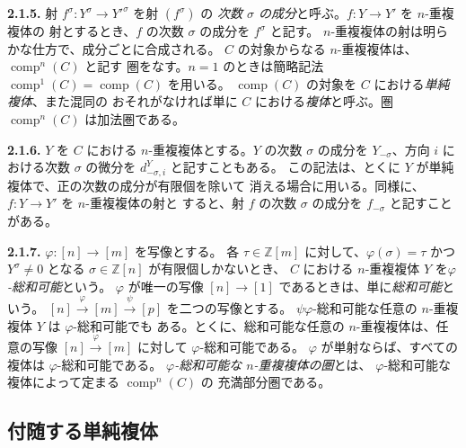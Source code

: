 \clearpage
{}%
\noindent\textbf{2.1.5.}\quad
射 $f^\sigma\colon Y^\sigma\to Y'^\sigma$ を射 $(f^\sigma)$ の
\emph{次数 $\sigma$ の成分}と呼ぶ。$f\colon Y\to Y'$ を $n$-重複複体の
射とするとき、$f$ の次数 $\sigma$ の成分を $f^\sigma$ と記す。
$n$-重複複体の射は明らかな仕方で、成分ごとに合成される。
$C$ の対象からなる $n$-重複複体は、$\operatorname{comp}^{n}(C)$ と記す
圏をなす。$n=1$ のときは簡略記法
$\operatorname{comp}^{1}(C)=\operatorname{comp}(C)$ を用いる。
$\operatorname{comp}(C)$ の対象を $C$ における\emph{単純複体}、また混同の
おそれがなければ単に $C$ における\emph{複体}と呼ぶ。圏
$\operatorname{comp}^{n}(C)$ は加法圏である。

\noindent\textbf{2.1.6.}\quad
$Y$ を $C$ における $n$-重複複体とする。$Y$ の次数 $\sigma$ の成分を
$Y_{-\sigma}$、方向 $i$ における次数 $\sigma$ の微分を
$d^Y_{-\sigma,i}$ と記すこともある。
この記法は、とくに $Y$ が単純複体で、正の次数の成分が有限個を除いて
消える場合に用いる。同様に、$f\colon Y\to Y'$ を $n$-重複複体の射と
すると、射 $f$ の次数 $\sigma$ の成分を $f_{-\sigma}$ と記すことがある。

\noindent\textbf{2.1.7.}\quad
$\varphi\colon[n]\to[m]$ を写像とする。
各 $\tau\in\mathbb Z[m]$ に対して、$\varphi(\sigma)=\tau$ かつ
$Y^\sigma\neq0$ となる $\sigma\in\mathbb Z[n]$ が有限個しかないとき、
$C$ における $n$-重複複体 $Y$ を\emph{$\varphi$-総和可能}という。
$\varphi$ が唯一の写像 $[n]\to[1]$ であるときは、単に\emph{総和可能}という。
$[n]\xrightarrow{\varphi}[m]\xrightarrow{\psi}[p]$ を二つの写像とする。
$\psi\varphi$-総和可能な任意の $n$-重複複体 $Y$ は $\varphi$-総和可能でも
ある。とくに、総和可能な任意の $n$-重複複体は、任意の写像
$[n]\xrightarrow{\varphi}[m]$ に対して $\varphi$-総和可能である。
$\varphi$ が単射ならば、すべての複体は $\varphi$-総和可能である。
\emph{$\varphi$-総和可能な $n$-重複複体の圏}とは、
$\varphi$-総和可能な複体によって定まる $\operatorname{comp}^{n}(C)$ の
充満部分圏である。

\subsection{付随する単純複体}

